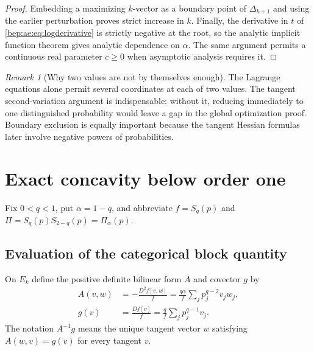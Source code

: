 \documentclass[11pt]{article}
\numberwithin{equation}{section}
\theoremstyle{definition}
\theoremstyle{remark}
\newtheorem{remark}[theorem]{Remark}
\begin{document}
\begin{proof}
Embedding a maximizing $k$-vector as a boundary point of $\Delta_{k+1}$
and using the earlier perturbation proves strict increase in $k$.
Finally, the derivative in $t$ of \eqref{bep:ae:eq:logderivative} is strictly
negative at the root, so the analytic implicit function theorem gives
analytic dependence on $\alpha$. The same argument permits a continuous
real parameter $c\geq0$ when asymptotic analysis requires it.
\end{proof}

\begin{remark}[Why two values are not by themselves enough]
The Lagrange equations alone permit several coordinates at each of two
values. The tangent second-variation argument is indispensable: without
it, reducing immediately to one distinguished probability would leave a
gap in the global optimization proof. Boundary exclusion is equally
important because the tangent Hessian formulas later involve negative
powers of probabilities.
\end{remark}

\section{Exact concavity below order one}\label{bep:ae:sec:subunit}
Fix $0<q<1$, put $\alpha=1-q$, and abbreviate $f=S_q(p)$ and
$\Pi=S_q(p)S_{2-q}(p)=\Pi_\alpha(p)$.

\subsection{Evaluation of the categorical block quantity}
On $E_k$ define the positive definite bilinear form $A$ and covector $g$ by
\begin{align}
 A(v,w)&=-\frac{D^2f[v,w]}f
       =\frac{q\alpha}{f}\sum_j p_j^{q-2}v_jw_j,\label{bep:ae:eq:A}\\
 g(v)&=\frac{Df[v]}f=\frac qf\sum_jp_j^{q-1}v_j.\label{bep:ae:eq:g}
\end{align}
The notation $A^{-1}g$ means the unique tangent vector $w$ satisfying
$A(w,v)=g(v)$ for every tangent $v$.
\end{document}
